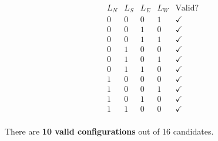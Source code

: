 \documentclass{article}
\theoremstyle{definition}
\begin{document}
\[
\begin{array}{cccc|l}
L_N & L_S & L_E & L_W & \text{Valid?} \\
\hline
0 & 0 & 0 & 1 & \checkmark \\
0 & 0 & 1 & 0 & \checkmark \\
0 & 0 & 1 & 1 & \checkmark \\
0 & 1 & 0 & 0 & \checkmark \\
0 & 1 & 0 & 1 & \checkmark \\
0 & 1 & 1 & 0 & \checkmark \\
1 & 0 & 0 & 0 & \checkmark \\
1 & 0 & 0 & 1 & \checkmark \\
1 & 0 & 1 & 0 & \checkmark \\
1 & 1 & 0 & 0 & \checkmark \\
\end{array}
\]

There are \textbf{10 valid configurations} out of 16 candidates.
\end{document}

